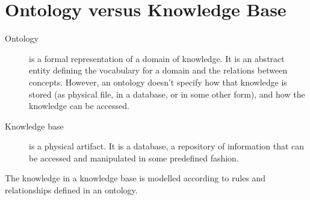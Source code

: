 \section{Ontology versus Knowledge Base}
\begin{description}
\item[Ontology] is a formal representation of a domain of knowledge. It is an abstract entity 
defining the vocabulary for a domain and the relations between concepts.
However, an ontology doesn't specify how that knowledge is stored 
(as physical file, in a database, or in some other form), and how the knowledge 
can be accessed.
\item[Knowledge base] is a physical artifact. It is a database, a repository of information 
that can be accessed and manipulated in some predefined fashion.
\end{description}
The knowledge in a knowledge base is modelled according to rules and relationships 
defined in an ontology.

